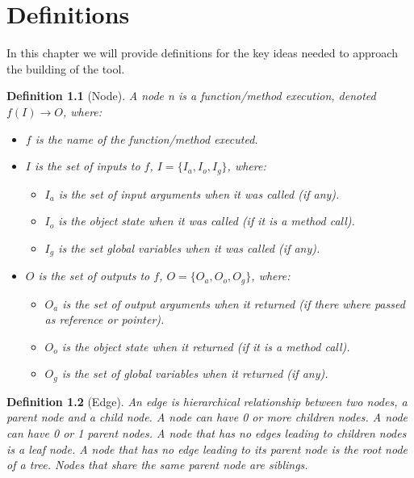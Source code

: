 \chapter{Definitions}
\label{cap:definiciones}

\newtheorem{definition}{Definition}

In this chapter we will provide definitions for the key ideas needed to approach the building of the tool.

\begin{definition}[Node]
A node n is a function/method execution, denoted \(f(I) \to O\), where:
\begin{itemize}
\item \(f\) is the name of the function/method executed.
\item \(I\) is the set of inputs to \(f\), \(I = \{I_a, I_o, I_g\}\), where:
\begin{itemize}
\item \(I_a\) is the set of input arguments when it was called (if any).
\item \(I_o\) is the object state when it was called (if it is a method call).
\item \(I_g\) is the set global variables when it was called (if any).
\end{itemize}
\item \(O\) is the set of outputs to \(f\), \(O = \{O_a, O_o, O_g\}\), where:
\begin{itemize}
\item \(O_a\) is the set of output arguments when it returned (if there where passed as reference or pointer).
\item \(O_o\) is the object state when it returned (if it is a method call).
\item \(O_g\) is the set of global variables when it returned (if any).
\end{itemize}
\end{itemize}
\end{definition}
\begin{definition}[Edge]
An edge is hierarchical relationship between two nodes, a parent node and a child node.
A node can have 0 or more children nodes.
A node can have 0 or 1 parent nodes.
A node that has no edges leading to children nodes is a leaf node.
A node that has no edge leading to its parent node is the root node of a tree.
Nodes that share the same parent node are siblings.
\end{definition}
